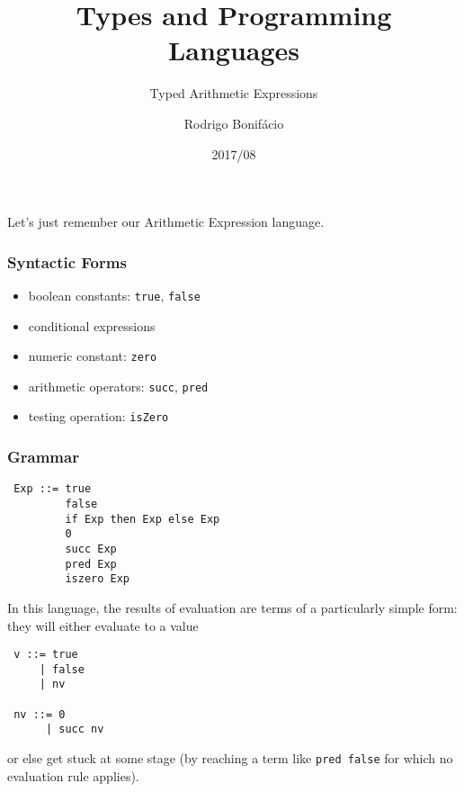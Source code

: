 \documentclass{beamer}
\title{Types and Programming Languages}
\subtitle{Typed Arithmetic Expressions}
\author{Rodrigo Bonif\'{a}cio}
\date{2017/08}
\begin{document}
\begin{frame}
\titlepage
\end{frame}

\begin{frame}

Let's just remember our {\color{blue}Arithmetic Expression}
language. 

\end{frame}

\begin{frame}
\frametitle{Syntactic Forms} 

\begin{itemize}
\item boolean constants: \texttt{true}, \texttt{false}
\item conditional expressions
\item numeric constant: \texttt{zero}
\item arithmetic operators: \texttt{succ}, \texttt{pred}
\item testing operation: \texttt{isZero} 
\end{itemize}
\end{frame}

\begin{frame}[fragile]
\frametitle{Grammar} 

\begin{verbatim}
 Exp ::= true
         false 
         if Exp then Exp else Exp
         0
         succ Exp
         pred Exp
         iszero Exp
\end{verbatim}
\end{frame}

\begin{frame}[fragile]
In this language, the results of evaluation
are terms of a particularly simple form: they will 
either evaluate to a value 

\begin{verbatim}
 v ::= true 
     | false 
     | nv

 nv ::= 0
      | succ nv 
\end{verbatim}

or else get {\color{blue}stuck} at some stage (by 
reaching a term like \texttt{pred false} for which 
no evaluation rule applies). 
\end{frame}

\end{document}
